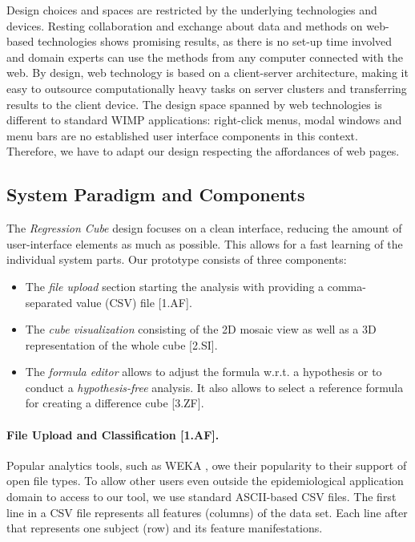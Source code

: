 \documentclass[journal]{style/vgtc} 			          %
\newcommand{\com}[1]{\textcolor{orange}{\uline{#1}}}
\begin{document}
\noindent Design choices and spaces are restricted by the underlying technologies and devices.
Resting collaboration and exchange about data and methods on web-based technologies shows promising results, as there is no set-up time involved and domain experts can use the methods from any computer connected with the web.
By design, web technology is based on a client-server architecture, making it easy to outsource computationally heavy tasks on server clusters and transferring results to the client device.
The design space spanned by web technologies is different to standard WIMP applications: right-click menus, modal windows and menu bars are no established user interface components in this context.
Therefore, we have to adapt our design respecting the affordances of web pages.
\subsection{System Paradigm and Components}
The \emph{Regression Cube} design focuses on a clean interface, reducing the amount of user-interface elements as much as possible.
This allows for a fast learning of the individual system parts.
Our prototype consists of three components:
\begin{itemize}
	\item The \emph{file upload} section starting the analysis with providing a comma-separated value (CSV) file [1.AF].
	\item The \emph{cube visualization} consisting of the 2D mosaic view as well as a 3D representation of the whole cube [2.SI].
	\item The \emph{formula editor} allows to adjust the formula w.r.t. a hypothesis or to conduct a \emph{hypothesis-free} analysis.
	It also allows to select a reference formula for creating a difference cube [3.ZF].
\end{itemize}
\paragraph{File Upload and Classification [1.AF].}
Popular analytics tools, such as WEKA \cite{WEKA}, owe their popularity to their support of open file types.
To allow other users even outside the epidemiological application domain to access to our tool, we use standard ASCII-based CSV files.
The first line in a CSV file represents all features (columns) of the data set.
Each line after that represents one subject (row) and its feature manifestations.
\end{document}

